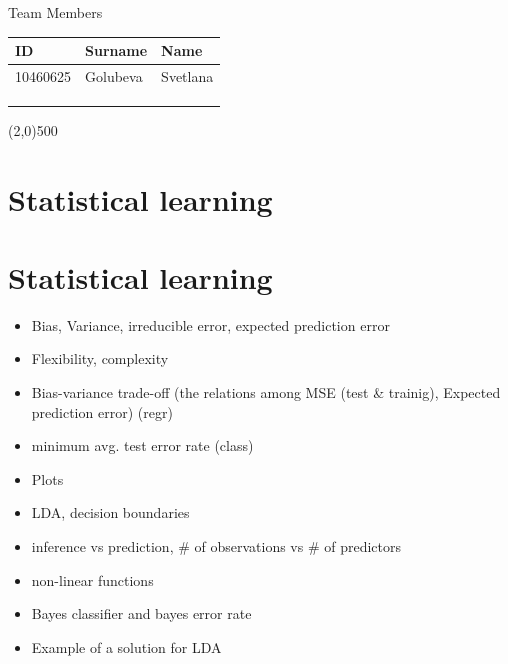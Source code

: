 \documentclass[a4paper,12pt,titlepage]{article} %
\begin{document}
\begin{titlepage}
		\vspace{20pt}
		
		\begin{center}
			{\large Team Members}
		\end{center}
		\begin{tabularx}{\textwidth}{|X|X|X|}
			\hline
			ID & Surname & Name\\
			\hline
			10460625 & Golubeva & Svetlana\\
			\hline
			&  & \\
			\hline
			&  & \\
			\hline
			&  & \\
			\hline
		\end{tabularx}
		
		\vspace{\fill}
		\begin{center}
			\line(2,0){500}
		\end{center}
		
	\end{titlepage}
\tableofcontents

\newpage
\section{Statistical learning}

\section{Statistical learning}
\begin{itemize}
	\item Bias, Variance, irreducible error, expected prediction error
	\item Flexibility, complexity
	\item Bias-variance trade-off (the relations among MSE (test \& trainig), Expected prediction error) (regr)
	\item minimum avg. test error rate (class)
	\item Plots
	\item LDA, decision boundaries
	\item inference vs prediction, \# of observations vs \# of predictors
	\item non-linear functions
	\item Bayes classifier and bayes error rate
	\item Example of a solution for LDA
\end{itemize}
\end{document}
